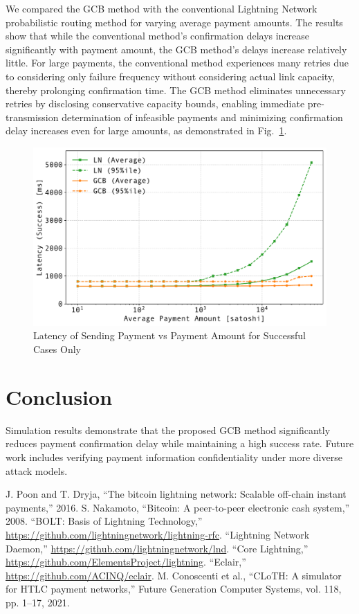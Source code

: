 \documentclass[conference]{IEEEtran}
\begin{document}
We compared the GCB method with the conventional Lightning Network probabilistic routing method for varying average payment amounts.
The results show that while the conventional method's confirmation delays increase significantly with payment amount, the GCB method's delays increase relatively little.
For large payments, the conventional method experiences many retries due to considering only failure frequency without considering actual link capacity, thereby prolonging confirmation time.
The GCB method eliminates unnecessary retries by disclosing conservative capacity bounds, enabling immediate pre-transmission determination of infeasible payments and minimizing confirmation delay increases even for large amounts, as demonstrated in Fig.~\ref{fig:pmt_amt_vs_time}.

\begin{figure}[htbp]
	\centerline{\includegraphics[width=\linewidth]{fig/pmt_amt_vs_time}}
	\caption{Latency of Sending Payment vs Payment Amount for Successful Cases Only}
	\label{fig:pmt_amt_vs_time}
\end{figure}

\section{Conclusion}

Simulation results demonstrate that the proposed GCB method significantly reduces payment confirmation delay while maintaining a high success rate.
Future work includes verifying payment information confidentiality under more diverse attack models.

\begin{thebibliography}{00}
	 J. Poon and T. Dryja, ``The bitcoin lightning network: Scalable off-chain instant payments,'' 2016.
	 S. Nakamoto, ``Bitcoin: A peer-to-peer electronic cash system,'' 2008.
	 ``BOLT: Basis of Lightning Technology,'' \url{https://github.com/lightningnetwork/lightning-rfc}.
	 ``Lightning Network Daemon,'' \url{https://github.com/lightningnetwork/lnd}.
	 ``Core Lightning,'' \url{https://github.com/ElementsProject/lightning}.
	 ``Eclair,'' \url{https://github.com/ACINQ/eclair}.
	 M. Conoscenti et al., ``CLoTH: A simulator for HTLC payment networks,'' Future Generation Computer Systems, vol. 118, pp. 1--17, 2021.
\end{thebibliography}
\end{document}
